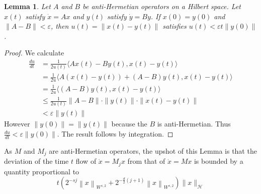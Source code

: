 \documentclass[12pt]{amsart}
\newtheorem{lemma}{Lemma}
\newcommand{\norm}[1]{\ensuremath{\left\lVert #1\right\rVert}}
\begin{document}
\begin{lemma}
Let $A$ and $B$ be anti-Hermetian operators on a Hilbert space.  Let $x(t)$ satisfy $\dot{x} = Ax$ and $y(t)$ satisfy $\dot{y} = By$.  If $x(0) = y(0)$ and $\| A - B \| < \varepsilon$, then $u(t) = \| x(t) - y(t) \|$ satisfies $u(t) < \varepsilon t  \| y(0) \|$.
\end{lemma}

\begin{proof}
	We calculate
	\begin{align*}
		\frac{du}{dt} &= \frac{1}{2u(t)} \langle Ax(t) - By(t) , x(t) - y(t) \rangle \\
			&= \frac{1}{2u} \langle A(x(t)-y(t)) + (A-B) y(t) , x(t) - y(t) \rangle \\
			&= \frac{1}{2u} \langle (A-B)y(t) , x(t) - y(t) \rangle \\
			&\leq \frac{1}{2u(t)} \| A - B \| \cdot \| y(t) \| \cdot \| x(t) - y(t) \| \\
			&< \varepsilon \| y(t) \|
	\end{align*}
	However $\| y(0) \| = \| y(t)\|$ because the $B$ is anti-Hermetian.  Thus $\frac{du}{dt} < \varepsilon \| y(0)\|$.	The result follows by integration.
\end{proof}
As $M$ and $M_j$ are anti-Hermetian operators, the upshot of this Lemma is that the deviation of the time $t$ flow of $\dot{x} = M_j x$ from that of $\dot{x} = Mx$ is bounded by a quantity proportional to
\[
 	t \left( 2^{-sj}\norm{x}_{W^{s,2}} + 2^{-\frac{d}{2}(j+1)}\norm{x}_{W^{s,2}} \right) \| x \|_{\mathcal{H}}
\]
\end{document}
